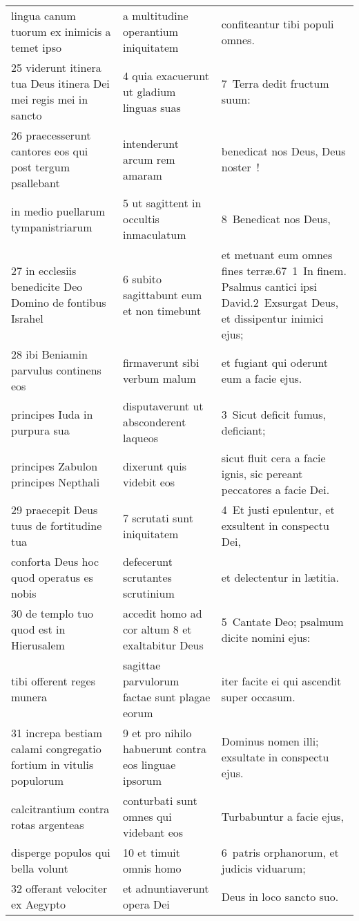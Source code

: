 \documentclass{article}
\begin{document}
\begin{longtable}{@{}p{}p{}p{}@{}}
lingua canum tuorum ex inimicis a temet ipso	&	a multitudine operantium iniquitatem	&	confiteantur tibi populi omnes.	\\
25 viderunt itinera tua Deus itinera Dei mei regis mei in sancto	&	4 quia exacuerunt ut gladium linguas suas	&	7 Terra dedit fructum suum:	\\
26 praecesserunt cantores eos qui post tergum psallebant	&	intenderunt arcum rem amaram	&	benedicat nos Deus, Deus noster !	\\
in medio puellarum tympanistriarum	&	5 ut sagittent in occultis inmaculatum	&	8 Benedicat nos Deus,	\\
27 in ecclesiis benedicite Deo Domino de fontibus Israhel	&	6 subito sagittabunt eum et non timebunt	&	et metuant eum omnes fines terræ.67 1 In finem. Psalmus cantici ipsi David.2 Exsurgat Deus, et dissipentur inimici ejus;	\\
28 ibi Beniamin parvulus continens eos	&	firmaverunt sibi verbum malum	&	et fugiant qui oderunt eum a facie ejus.	\\
principes Iuda in purpura sua	&	disputaverunt ut absconderent laqueos	&	3 Sicut deficit fumus, deficiant;	\\
principes Zabulon principes Nepthali	&	dixerunt quis videbit eos	&	sicut fluit cera a facie ignis, sic pereant peccatores a facie Dei.	\\
29 praecepit Deus tuus de fortitudine tua	&	7 scrutati sunt iniquitatem	&	4 Et justi epulentur, et exsultent in conspectu Dei,	\\
conforta Deus hoc quod operatus es nobis	&	defecerunt scrutantes scrutinium	&	et delectentur in lætitia.	\\
30 de templo tuo quod est in Hierusalem	&	accedit homo ad cor altum 8 et exaltabitur Deus	&	5 Cantate Deo; psalmum dicite nomini ejus:	\\
tibi offerent reges munera	&	sagittae parvulorum factae sunt plagae eorum	&	iter facite ei qui ascendit super occasum.	\\
31 increpa bestiam calami congregatio fortium in vitulis populorum	&	9 et pro nihilo habuerunt contra eos linguae ipsorum	&	Dominus nomen illi; exsultate in conspectu ejus.	\\
calcitrantium contra rotas argenteas	&	conturbati sunt omnes qui videbant eos	&	Turbabuntur a facie ejus,	\\
disperge populos qui bella volunt	&	10 et timuit omnis homo	&	6 patris orphanorum, et judicis viduarum;	\\
32 offerant velociter ex Aegypto	&	et adnuntiaverunt opera Dei	&	Deus in loco sancto suo.	\\

\end{longtable}
\end{document}
